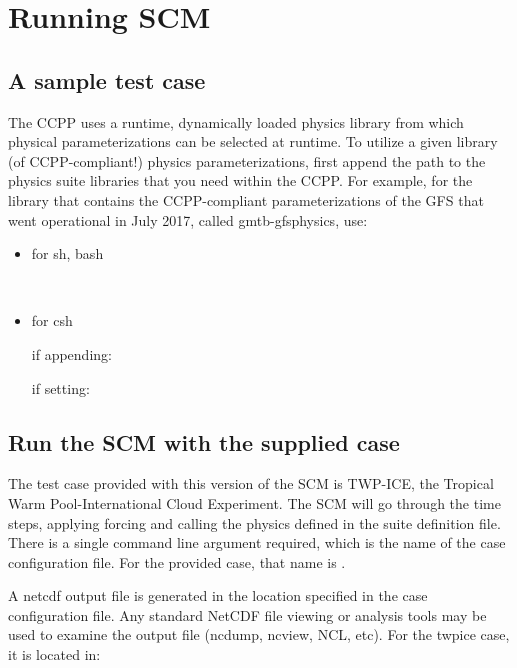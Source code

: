 \chapter{Running SCM}
\label{chapter: runningscm}
\setlength{\parskip}{12pt}
\label{section: runningscm}

\section{A sample test case}

The CCPP uses a runtime, dynamically loaded physics library from which physical parameterizations can be selected at runtime.  To utilize a given library (of CCPP-compliant!) physics parameterizations, first append the path to the physics suite libraries that you need
within the CCPP. For example, for the library that contains the CCPP-compliant parameterizations of the GFS that went operational in July 2017,
called gmtb-gfsphysics, use:
\begin{itemize}
	\item for sh, bash

     \\

	\item for csh

     if appending: \\

     if setting: \\
\end{itemize}


\section{Run the SCM with the supplied case} 
The test case provided with this version of the SCM is TWP-ICE, the Tropical Warm Pool-International Cloud Experiment. The SCM will go through the time steps, applying forcing and calling the physics defined in the suite definition file.
There is a single command line argument required, which is the name of the case configuration file.  For the provided case, that name is .


A netcdf output file is generated in the location specified in the case
configuration file. Any standard NetCDF file viewing or analysis tools may be used to 
examine the output file (ncdump, ncview, NCL, etc).  For the twpice case, it is located in:

